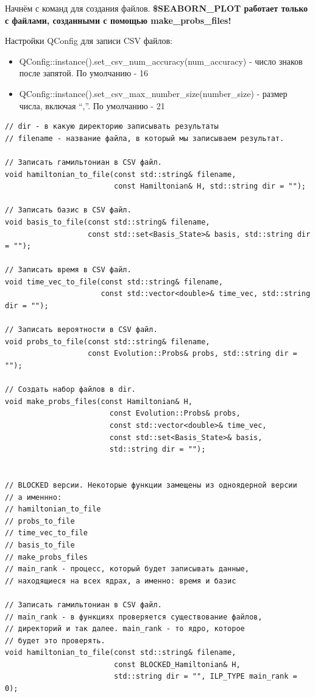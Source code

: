 \documentclass[12pt,fleqn]{article}
\begin{document}
         Начнём с команд для создания файлов. \textbf{\textsf{\$SEABORN\_PLOT} работает только с файлами, созданными с помощью make\_probs\_files!}

         Настройки QConfig для записи CSV файлов:
         \begin{itemize}
            \item{QConfig::instance().set\_csv\_num\_accuracy(num\_accuracy) - число знаков после запятой. По умолчанию - 16}
            \item{QConfig::instance().set\_csv\_max\_number\_size(number\_size) - размер числа, включая ``,''. По умолчанию - 21}
         \end{itemize}
\begin{mdframed}[linecolor=black, topline=true, bottomline=true,
leftline=false, rightline=false]
\begin{verbatim}
// dir - в какую директорию записывать результаты
// filename - название файла, в который мы записываем результат.

// Записать гамильтониан в CSV файл.
void hamiltonian_to_file(const std::string& filename,
                         const Hamiltonian& H, std::string dir = "");

// Записать базис в CSV файл.
void basis_to_file(const std::string& filename,
                   const std::set<Basis_State>& basis, std::string dir = "");

// Записать время в CSV файл.
void time_vec_to_file(const std::string& filename,
                      const std::vector<double>& time_vec, std::string dir = "");

// Записать вероятности в CSV файл.
void probs_to_file(const std::string& filename,
                   const Evolution::Probs& probs, std::string dir = "");

// Создать набор файлов в dir.
void make_probs_files(const Hamiltonian& H,
                        const Evolution::Probs& probs,
                        const std::vector<double>& time_vec,
                        const std::set<Basis_State>& basis,
                        std::string dir = "");


// BLOCKED версии. Некоторые функции замещены из одноядерной версии
// а именнно:
// hamiltonian_to_file
// probs_to_file
// time_vec_to_file
// basis_to_file
// make_probs_files
// main_rank - процесс, который будет записывать данные,
// находящиеся на всех ядрах, а именно: время и базис

// Записать гамильтониан в CSV файл.
// main_rank - в функциях проверяется существование файлов,
// директорий и так далее. main_rank - то ядро, которое 
// будет это проверять.
void hamiltonian_to_file(const std::string& filename,
                         const BLOCKED_Hamiltonian& H,
                         std::string dir = "", ILP_TYPE main_rank = 0);


\end{verbatim}
\end{mdframed}
\end{document}
